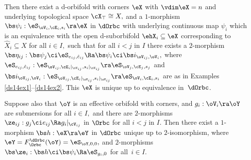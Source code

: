 \documentclass{article}
\begin{document}
\begin{thm}
Then there exist a d-orbifold with corners\/ $\eX$ with\/
$\vdim\eX=n$ and underlying topological space $\cX_\top\cong X,$ and
a $1$-morphism $\bs\psi_i:\eS_{\oV_i,\cE_i,s_i}\ra\eX$ in $\dOrbc$
with underlying continuous map $\psi_i$ which is an equivalence with
the open d-suborbifold\/ $\ehX_i\subseteq\eX$ corresponding to $\hat
X_i\subseteq X$ for all\/ $i\in I,$ such that for all\/ $i<j$ in $I$
there exists a $2$-morphism\/
$\bs\eta_{ij}:\bs\psi_j\ci\eS_{e_{ij},\hat e_{ij}}\Ra\bs\psi_i\ci\bs
i_{\oV_{ij},\oV_i},$ where $\eS_{e_{ij},\hat e_{ij}}:
\eS_{\oV_{ij},\cE_i\vert_{\oV_{ij}},s_i\vert_{\oV_{ij}}}\ra
\eS_{\oV_j,\cE_j,s_j}$ and\/ $\bs i_{\oV_{ij},\oV_i}:
\eS_{\oV_{ij},\cE_i\vert_{\oV_{ij}},s_i\vert_{\oV_{ij}}}\ra
\eS_{\oV_i,\cE_i,s_i}$ are as in Examples\/
{\rm\ref{ds14ex1}--\ref{ds14ex2}}. This
$\eX$ is unique up to equivalence in~$\dOrbc$.

Suppose also that\/ $\oY$ is an effective orbifold with corners,
and\/ $g_i:\oV_i\ra\oY$ are submersions for all\/ $i\in I,$ and
there are\/ $2$-morphisms $\ze_{ij}:g_j\ci e_{ij}\Ra
g_i\vert_{\cV_{ij}}$ in $\Orbc$ for all\/ $i<j$ in $I$. Then there
exist a $1$-morphism $\bs h:\eX\ra\eY$ in $\dOrbc$ unique up to
$2$-isomorphism, where $\eY=F_\Orbc^\dOrbc(\oY)=\eS_{\oY,0,0},$
and\/ $2$-morphisms $\bs\ze_i:\bs h\ci\bs\psi_i\Ra\eS_{g_i,0}$ for
all\/~$i\in I$.
\label{ds14thm4}
\end{thm}
\end{document}
